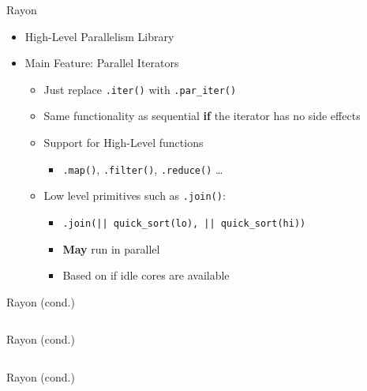 \documentclass[compress,aspectratio=169]{beamer}
\begin{document}
\begin{frame}{Rayon \cite{rayon}}
  \begin{itemize}
    \item High-Level Parallelism Library
    \item Main Feature: Parallel Iterators
      \begin{itemize}
        \item Just replace \texttt{.iter()} with \texttt{.par\_iter()}
        \item Same functionality as sequential \textbf{if} the iterator has no side effects
        \item Support for High-Level functions
          \begin{itemize}
            \item \texttt{.map()}, \texttt{.filter()}, \texttt{.reduce()} \dots
          \end{itemize}
        \item Low level primitives such as \texttt{.join()}:
          \begin{itemize}
            \item \texttt{.join(|| quick\_sort(lo), || quick\_sort(hi))}
            \item \textbf{May} run in parallel
            \item Based on if idle cores are available
          \end{itemize}
      \end{itemize}
  \end{itemize}
\end{frame}

\begin{frame}{Rayon (cond.)}
  \begin{tcolorbox}[title=Unported Code (no transpose)]
    \footnotesize\inputminted[xleftmargin=1em,linenos]{rust}{./assets/01rayon.rs}
  \end{tcolorbox}
\end{frame}

\begin{frame}{Rayon (cond.)}
  \begin{tcolorbox}[title=Ported to Iterators]
    \footnotesize\inputminted[xleftmargin=1em,linenos]{rust}{./assets/02rayon.rs}
  \end{tcolorbox}
\end{frame}

\begin{frame}{Rayon (cond.)}
  \begin{tcolorbox}[title=Ported to Iterators \textbf{and Parallelized!}]
    \footnotesize\inputminted[xleftmargin=1em,linenos]{rust}{./assets/03rayon.rs}
  \end{tcolorbox}
\end{frame}
\end{document}
